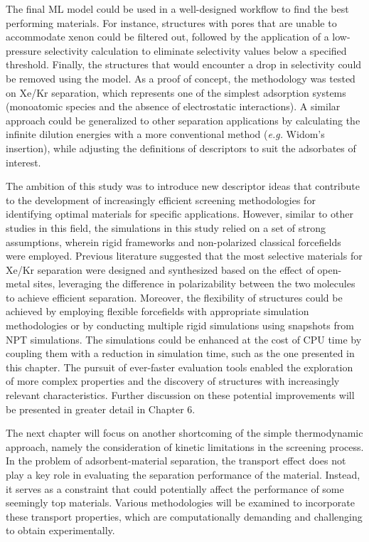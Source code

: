 \documentclass[main]{subfiles}
\begin{document}
The final ML model could be used in a well-designed workflow to find the best performing materials. For instance, structures with pores that are unable to accommodate xenon could be filtered out, followed by the application of a low-pressure selectivity calculation to eliminate selectivity values below a specified threshold. Finally, the structures that would encounter a drop in selectivity could be removed using the model. As a proof of concept, the methodology was tested on Xe/Kr separation, which represents one of the simplest adsorption systems (monoatomic species and the absence of electrostatic interactions). A similar approach could be generalized to other separation applications by calculating the infinite dilution energies with a more conventional method (\emph{e.g.} Widom's insertion), while adjusting the definitions of descriptors to suit the adsorbates of interest.

The ambition of this study was to introduce new descriptor ideas that contribute to the development of increasingly efficient screening methodologies for identifying optimal materials for specific applications. However, similar to other studies in this field, the simulations in this study relied on a set of strong assumptions, wherein rigid frameworks and non-polarized classical forcefields were employed. Previous literature suggested that the most selective materials for Xe/Kr separation were designed and synthesized based on the effect of open-metal sites, leveraging the difference in polarizability between the two molecules to achieve efficient separation.\autocite{Li_2019, Pei_2022} Moreover, the flexibility of structures could be achieved by employing flexible forcefields with appropriate simulation methodologies\autocite{Bousquet2012} or by conducting multiple rigid simulations using snapshots from NPT simulations\autocite{Witman_2017}. The simulations could be enhanced at the cost of CPU time by coupling them with a reduction in simulation time, such as the one presented in this chapter. The pursuit of ever-faster evaluation tools enabled the exploration of more complex properties and the discovery of structures with increasingly relevant characteristics. Further discussion on these potential improvements will be presented in greater detail in Chapter 6.

\vspace{1cm}

The next chapter will focus on another shortcoming of the simple thermodynamic approach, namely the consideration of kinetic limitations in the screening process. In the problem of adsorbent-material separation, the transport effect does not play a key role in evaluating the separation performance of the material. Instead, it serves as a constraint that could potentially affect the performance of some seemingly top materials. Various methodologies will be examined to incorporate these transport properties, which are computationally demanding and challenging to obtain experimentally.

\OnlyInSubfile{\printglobalbibliography}
\end{document}
